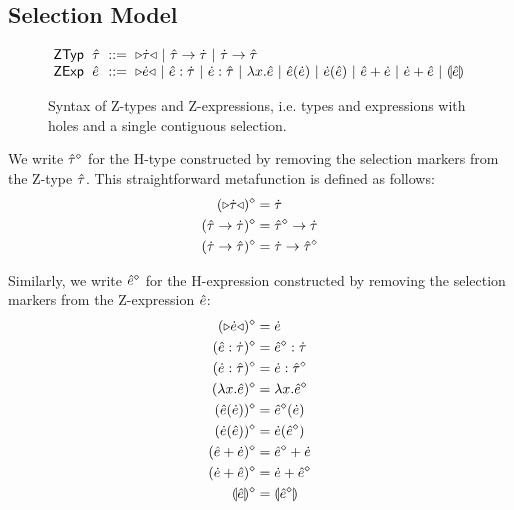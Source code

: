 \documentclass{llncs}
\begin{document}
\subsection{Selection Model}
\begin{figure}
\hspace{-3px}$\arraycolsep=3pt\begin{array}{lllllll}
\mathsf{ZTyp} & \ztau & ::= & 
  \zwsel{\htau} ~\vert~  
  \tarr{\ztau}{\htau} ~\vert~ 
  \tarr{\htau}{\ztau} \\
\mathsf{ZExp} & \zexp & ::= & 
  \zwsel{\hexp} ~\vert~
  \zexp : \htau ~\vert~
  \hexp : \ztau ~\vert~
  \hlam{x}{\zexp} ~\vert~
  \hap{\zexp}{\hexp} ~\vert~
  \hap{\hexp}{\zexp} ~\vert~
  \hadd{\zexp}{\hexp} ~\vert~
  \hadd{\hexp}{\zexp} ~\vert~
  \hhole{\zexp}
\end{array}$
\caption{Syntax of Z-types and Z-expressions, i.e. types and expressions with holes and a single contiguous selection.}
\label{fig:zexp-syntax}
\end{figure}

We write $\hat{\tau}^{\diamond}$ for the H-type constructed by removing the selection markers from the Z-type $\hat{\tau}$. This straightforward metafunction is defined as follows:
\begin{align*}
({\triangleright}{\dot{\tau}}{\triangleleft})^{\diamond} & = \dot{\tau}\\
(\hat{\tau} \rightarrow \dot{\tau})^{\diamond} & = \hat{\tau}^{\diamond} \rightarrow \dot{\tau}\\
(\dot{\tau} \rightarrow \hat{\tau})^{\diamond} & = \dot{\tau} \rightarrow \hat{\tau}^{\diamond}
\end{align*}

Similarly, we write $\hat{e}^{\diamond}$ for the H-expression constructed by removing the selection markers from the Z-expression $\hat{e}$:
\begin{align*}
({\triangleright}{\dot{e}}{\triangleleft})^{\diamond} & = \dot{e}\\
(\hat{e} : \dot{\tau})^{\diamond} & = \hat{e}^{\diamond} : \dot{\tau}\\
(\dot{e} : \hat{\tau})^{\diamond} & = \dot{e} : \hat{\tau}^{\diamond}\\
(\lambda x.\hat{e})^{\diamond} & = \lambda x.\hat{e}^{\diamond}\\
(\hat{e}(\dot{e}))^{\diamond} & = \hat{e}^{\diamond}(\dot{e})\\
(\dot{e}(\hat{e}))^{\diamond} & = \dot{e}(\hat{e}^{\diamond})\\
(\hat{e} + \dot{e})^{\diamond} & = \hat{e}^{\diamond} + \dot{e}\\
(\dot{e} + \hat{e})^{\diamond} & = \dot{e} + \hat{e}^{\diamond}\\
\llparenthesis\hat{e}\rrparenthesis^{\diamond} &= \llparenthesis\hat{e}^{\diamond}\rrparenthesis
\end{align*}
\end{document}

